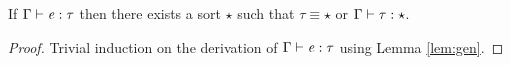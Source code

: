 \begin{lem}\label{lem:corrtyp}
    If $\Gamma  \vdash  \mathit{e}  :  \tau$ then there exists a sort $\star$ such that $\tau  \equiv  \star$ or $\Gamma  \vdash  \tau  :  \star$.
\end{lem}

\begin{proof}
    Trivial induction on the derivation of $\Gamma  \vdash  \mathit{e}  :  \tau$ using Lemma \ref{lem:gen}.
\end{proof}

	



